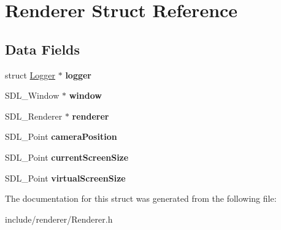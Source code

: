 \hypertarget{struct_renderer}{}\section{Renderer Struct Reference}
\label{struct_renderer}
\subsection*{Data Fields}
\begin{DoxyCompactItemize}
\item 
\hypertarget{struct_renderer_af4d650f26e6e1a4b53c751abc1eff45e}{}\label{struct_renderer_af4d650f26e6e1a4b53c751abc1eff45e} 
struct \hyperlink{struct_logger}{Logger} $\ast$ {\bfseries logger}
\item 
\hypertarget{struct_renderer_aaa8e409e04dcf575ef63fd5fb3db06f9}{}\label{struct_renderer_aaa8e409e04dcf575ef63fd5fb3db06f9} 
S\+D\+L\+\_\+\+Window $\ast$ {\bfseries window}
\item 
\hypertarget{struct_renderer_a966da7a60c4ea3ba301e26ccc5efe452}{}\label{struct_renderer_a966da7a60c4ea3ba301e26ccc5efe452} 
S\+D\+L\+\_\+\+Renderer $\ast$ {\bfseries renderer}
\item 
\hypertarget{struct_renderer_a100180e2e1f4392fe765aa7e5b800215}{}\label{struct_renderer_a100180e2e1f4392fe765aa7e5b800215} 
S\+D\+L\+\_\+\+Point {\bfseries camera\+Position}
\item 
\hypertarget{struct_renderer_aa5fcda74f70efa26b808237cba88d273}{}\label{struct_renderer_aa5fcda74f70efa26b808237cba88d273} 
S\+D\+L\+\_\+\+Point {\bfseries current\+Screen\+Size}
\item 
\hypertarget{struct_renderer_a43723e61c3f9430011b1fee41436e6ae}{}\label{struct_renderer_a43723e61c3f9430011b1fee41436e6ae} 
S\+D\+L\+\_\+\+Point {\bfseries virtual\+Screen\+Size}
\end{DoxyCompactItemize}


The documentation for this struct was generated from the following file\+:\begin{DoxyCompactItemize}
\item 
include/renderer/Renderer.\+h\end{DoxyCompactItemize}
